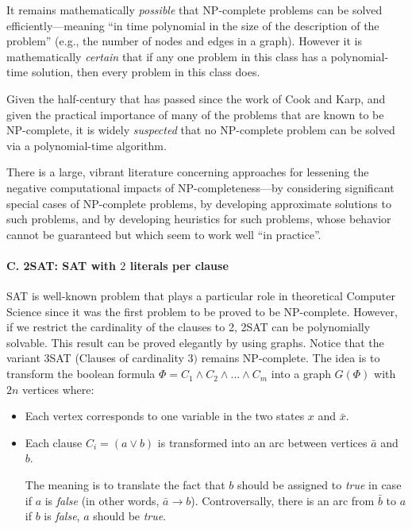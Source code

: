 It remains mathematically {\em possible} that {\sf NP}-complete
problems can be solved efficiently---meaning ``in time polynomial in
the size of the description of the problem'' (e.g., the number of
nodes and edges in a graph).  However it is mathematically {\em
  certain} that if any one problem in this class has a polynomial-time
solution, then every problem in this class does.

Given the half-century that has passed since the work of Cook and
Karp, and given the practical importance of many of the problems that
are known to be {\sf NP}-complete, it is widely {\em suspected} that
no {\sf NP}-complete problem can be solved via a polynomial-time
algorithm.

There is a large, vibrant literature concerning approaches for
lessening the negative computational impacts of {\sf
  NP}-completeness---by considering significant special cases of {\sf
  NP}-complete problems, by developing approximate solutions to such
problems, and by developing heuristics for such problems, whose
behavior cannot be guaranteed but which seem to work well ``in
practice''.




\paragraph{\small\sf C. 2SAT: SAT with $2$ literals per clause}

SAT is well-known problem that plays a particular role in theoretical
Computer Science since it was the first problem to be proved to be
NP-complete.  However, if we restrict the cardinality of the clauses
to 2, 2SAT can be polynomially solvable.  This result can be proved
elegantly by using graphs. Notice that the variant 3SAT (Clauses of
cardinality $3)$ remains NP-complete.  The idea is to transform the
boolean formula $\Phi = C_1 \wedge C_2 \wedge ... \wedge C_m$ into a
graph $G(\Phi)$ with $2n$ vertices where:

\begin{itemize}
\item
Each vertex corresponds to one variable in the two states $x$ and
$\bar{x}$.
\item
Each clause $C_i = (a \vee b)$ is transformed into an arc between
vertices $\bar{a}$ and $b$.

The meaning is to translate the fact that $b$ should be assigned to
{\em true} in case if $a$ is {\em false} (in other words, $\bar{a}
\rightarrow b$).  Controversally, there is an arc from $\bar{b}$ to
$a$ if $b$ is {\em false}, $a$ should be {\em true}.
\end{itemize}

